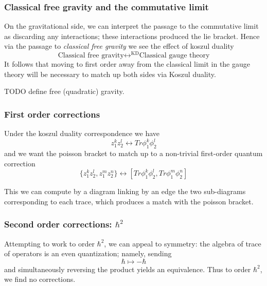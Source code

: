\documentclass[12pt]{amsart}
\begin{document}
\subsubsection{Classical free gravity and the commutative limit}
On the gravitational side, we can interpret the passage to the commutative
limit as discarding any interactions; these interactions produced the lie
bracket. Hence via the passage to \textit{classical free
gravity} we see the effect of koszul duality $$\textrm{Classical free gravity} \leftrightarrow^{\textrm{KD}} \textrm{Classical gauge theory}$$
It follows that moving to first order away from the classical limit in the
gauge theory will be necessary to match up both sides via Koszul
duality\footnotemark.

TODO define free (quadratic) gravity.

\subsubsection{First order corrections}

Under the koszul duality correspondence we have
$$z_1^k z_2^l \leftrightarrow Tr \phi_1^k\phi_2^l$$
and we want the poisson bracket to match up to a non-trivial first-order
quantum correction $$\{z_1^kz_2^l,z_1^mz_2^n\} \leftrightarrow [Tr
\phi_1^k\phi_2^l, Tr \phi_1^m\phi_2^n]$$

This we can compute by a diagram linking by an edge the two sub-diagrams corresponding to
each trace, which produces a match with the poisson bracket.

\subsubsection{Second order corrections: $\hbar^2$}
Attempting to work to order $\hbar^2$, we can appeal to symmetry: the algebra
of trace of operators is an even quantization; namely, sending $$\hbar \mapsto
-\hbar$$ and simultaneously reversing the product yields an equivalence. Thus
to order $\hbar^2$, we find no corrections.
\end{document}
